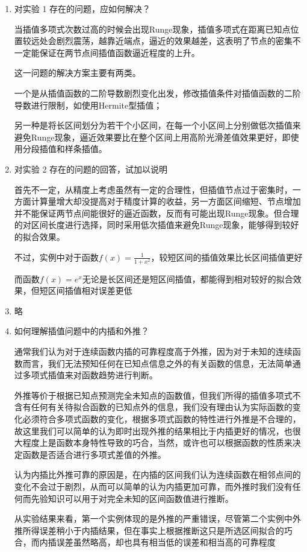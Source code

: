 \documentclass[11pt]{article}
\begin{document}
    \begin{enumerate}
\def\labelenumi{\arabic{enumi}.}
\item
  对实验 1 存在的问题，应如何解决？

  当插值多项式次数过高的时候会出现Runge现象，插值多项式在距离已知点位置较远处会剧烈震荡，越靠近端点，逼近的效果越差，这表明了节点的密集不一定能保证在两节点间插值函数逼近程度的上升。

  这一问题的解决方案主要有两类。

  一个是从插值函数的二阶导数剧烈变化出发，修改插值条件对插值函数的二阶导数进行限制，如使用Hermite型插值；

  另一种是将长区间划分为若干个小区间，在每一个小区间上分别做低次插值来避免Runge现象，逼近效果要比在整个区间上用高阶光滑差值效果更好，即使用分段插值和样条插值。
\item
  对实验 2 存在的问题的回答，试加以说明

  首先不一定，从精度上考虑虽然有一定的合理性，但插值节点过于密集时，一方面计算量增大却没提高对于精度计算的收益，另一方面区间缩短、节点增加并不能保证两节点间能很好的逼近函数，反而有可能出现Runge现象。但合理的对区间长度进行选择，同时采用低次插值来避免Runge现象，能够得到较好的拟合效果。

  不过，实例中对于函数\(f(x)=\frac{1}{1+x^2}\)，较短区间的插值效果比长区间插值更好

  而函数\(f(x)=e^x\)无论是长区间还是短区间插值，都能得到相对较好的拟合效果，但短区间插值相对误差更低
\item
  略
\item
  如何理解插值问题中的内插和外推？

  通常我们认为对于连续函数内插的可靠程度高于外推，因为对于未知的连续函数而言，我们无法预知任何在已知点信息之外的有关函数的信息，无法简单通过多项式插值来对函数趋势进行判断。

  外推等价于根据已知点预测完全未知点的函数值，但我们所得的插值多项式不含有任何有关待拟合函数的已知点外的信息，我们没有理由认为实际函数的变化必须符合多项式函数的变化，根据多项式函数的特性进行外推是不合理的，故这里我们可以简单的认为即时出现外推的结果相比于内插更好的情况，也很大程度上是函数本身特性导致的巧合，当然，或许也可以根据函数的性质来决定函数是否适合进行多项式差值的外推。

  认为内插比外推可靠的原因是，在内插的区间我们认为连续函数在相邻点间的变化不会过于剧烈，从而可以简单的认为内插更加可靠，而外推时我们没有任何而先验知识可以用于对完全未知的区间函数值进行推断。

  从实验结果来看，第一个实例体现的是外推的严重错误，尽管第二个实例中外推所得误差稍小于内插结果，但在事实上根据推断这只是所选区间拟合的巧合，而内插误差虽然略高，却也具有相当低的误差和相当高的可靠程度
\end{enumerate}
\end{document}
